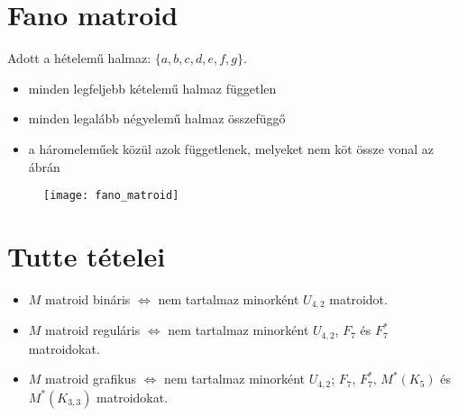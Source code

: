 \section*{Fano matroid}
Adott a hételemű halmaz: $\lbrace a,b,c,d,e,f,g \rbrace$.
\begin{itemize}
\item minden legfeljebb kételemű halmaz független
\item minden legalább négyelemű halmaz összefüggő
\item a háromeleműek közül azok függetlenek, melyeket nem köt össze vonal az ábrán
\end{itemize}

\begin{figure}[h!]
\texttt{[image: fano\_matroid]}
\centering
\end{figure}

\section*{Tutte tételei}
\begin{itemize}
\item $M$ matroid bináris $\Leftrightarrow$ nem tartalmaz minorként $U_{4,2}$ matroidot.
\item $M$ matroid reguláris $\Leftrightarrow$ nem tartalmaz minorként $U_{4,2}$, $F_{7}$ és $F_{7}^{*}$ matroidokat.
\item $M$ matroid grafikus $\Leftrightarrow$ nem tartalmaz minorként $U_{4,2}$; $F_{7}$, $F_{7}^{*}$, $M^{*}(K_{5})$ és $M^{*}(K_{3,3})$ matroidokat.
\end{itemize}